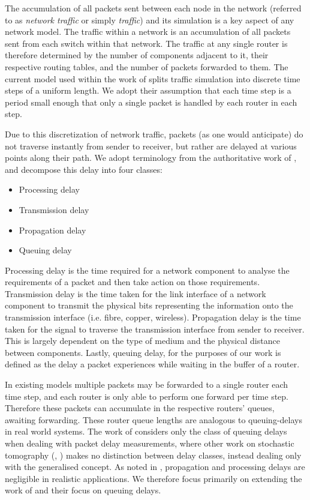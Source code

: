 The accumulation of all packets sent between each node in the network (referred to as \textit{network traffic} or simply \textit{traffic}) and its simulation is a key aspect of any network model. The traffic within a network is an accumulation of all packets sent from each switch within that network. The traffic at any single router is therefore determined by the number of components adjacent to it, their respective routing tables, and the number of packets forwarded to them. The current model used within the work of \cite{barnes_stochastic_2020} splits traffic simulation into discrete time steps of a uniform length. We adopt their assumption that each time step is a period small enough that only a single packet is handled by each router in each step.\par
Due to this discretization of network traffic, packets (as one would anticipate) do not traverse instantly from sender to receiver, but rather are delayed at various points along their path. We adopt terminology from the authoritative work of \cite{kurose_computer_2013}, and decompose this delay into four classes:
\begin{itemize}
    \item Processing delay
    \item Transmission delay
    \item Propagation delay
    \item Queuing delay
\end{itemize}
Processing delay is the time required for a network component to analyse the requirements of a packet and then take action on those requirements. Transmission delay is the time taken for the link interface of a network component to transmit the physical bits representing the information onto the transmission interface (i.e. fibre, copper, wireless). Propagation delay is the time taken for the signal to traverse the transmission interface from sender to receiver. This is largely dependent on the type of medium and the physical distance between components. Lastly, queuing delay, for the purposes of our work is defined as the delay a packet experiences while waiting in the buffer of a router.\par
In existing models multiple packets may be forwarded to a single router each time step, and each router is only able to perform one forward per time step. Therefore these packets can accumulate in the respective routers’ queues, awaiting forwarding. These router queue lengths are analogous to queuing-delays in real world systems. The work of \cite{barnes_stochastic_2020} considers only the class of queuing delays when dealing with packet delay measurements, where other work on stochastic tomography (\cite{kolar_distributed_2020}, \cite{he_fisher_2015}) makes no distinction between delay classes, instead dealing only with the generalised concept. As noted in \cite{telchemy_impact_2006}, propagation and processing delays are negligible in realistic applications. We therefore focus primarily on extending the work of \cite{barnes_stochastic_2020} and their focus on queuing delays.\par
